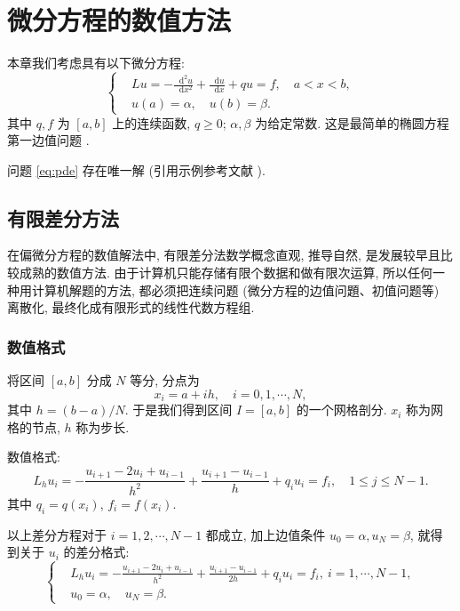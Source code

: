 \documentclass[UTF8,openany,twoside,12pt]{ctexbook}
\theoremstyle{plain}
\newcommand{\dif}{\mathop{}\!\mathrm{d}}
\begin{document}

\chapter{微分方程的数值方法}

本章我们考虑具有以下微分方程:
\begin{equation}\label{eq:pde}
\left\{\begin{aligned}
& L u=-\frac{{\dif}^{2} u}{\dif x^{2}}+\frac{\dif u}{\dif x}+q u=f, \quad a < x < b, \\
& u(a)=\alpha, \quad u(b)=\beta.
\end{aligned}\right.
\end{equation}
其中 $q, f$ 为 $[a,b]$ 上的连续函数, $q \geqslant 0$; $\alpha, \beta$ 为给定常数. 这是最简单的椭圆方程第一边值问题 .

问题 \eqref{eq:pde} 存在唯一解 (引用示例参考文献 \cite{LiLiu1997}).


\section{有限差分方法}
在偏微分方程的数值解法中, 有限差分法数学概念直观, 推导自然, 是发展较早且比较成熟的数值方法. 由于计算机只能存储有限个数据和做有限次运算, 所以任何一种用计算机解题的方法, 都必须把连续问题 (微分方程的边值问題、初值问题等) 离散化, 最终化成有限形式的线性代数方程组.

\subsection{数值格式}
将区间 $[a,b]$ 分成 $N$ 等分, 分点为
\begin{equation*}
  x_{i}=a+i h, \quad i=0,1, \cdots, N,
\end{equation*}
其中 $h=(b-a) / N$. 于是我们得到区间 $I=[a,b]$ 的一个网格剖分. $x_i$ 称为网格的节点, $h$ 称为步长.

数值格式:
\begin{equation*}
  L_{h} u_{i}=-\frac{u_{i+1}-2 u_{i}+u_{i-1}}{h^{2}}+\frac{u_{i+1}-u_{i-1}}{h}+q_{i} u_{i}=f_{i},\quad 1 \leqslant j \leqslant N-1.
\end{equation*}
其中  $q_{i}=q(x_{i})$, $f_{i}=f(x_{i})$.

以上差分方程对于 $i=1,2, \cdots, N-1$ 都成立, 加上边值条件 $u_{0}=\alpha, u_{N}=\beta$, 就得到关于 $u_i$ 的差分格式:
\begin{equation}\label{eq:fdm}
\left\{\begin{aligned}
& L_{h} u_{i}=-\frac{u_{i+1}-2 u_{i}+u_{i-1}}{h^{2}}+\frac{u_{i+1}-u_{i-1}}{2h}+q_{i} u_{i}=f_{i}, ~ i=1, \cdots, N-1, \\
& u_{0}=\alpha, \quad u_{N}=\beta.
\end{aligned}\right.
\end{equation}
\end{document}
